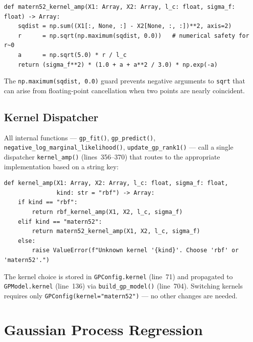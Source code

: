 \documentclass[11pt,a4paper]{article}
\theoremstyle{remark}
\newcommand{\codefile}[1]{\texttt{#1}}
\newcommand{\codeline}[1]{line~#1}
\newcommand{\coderange}[2]{lines~#1--#2}
\newcommand{\codefn}[1]{\texttt{#1()}}
\begin{document}
\begin{lstlisting}[firstnumber=343, caption=\codefn{matern52\_kernel\_amp} in \codefile{BO\_ML4F.py}]
def matern52_kernel_amp(X1: Array, X2: Array, l_c: float, sigma_f: float) -> Array:
    sqdist = np.sum((X1[:, None, :] - X2[None, :, :])**2, axis=2)
    r      = np.sqrt(np.maximum(sqdist, 0.0))   # numerical safety for r~0
    a      = np.sqrt(5.0) * r / l_c
    return (sigma_f**2) * (1.0 + a + a**2 / 3.0) * np.exp(-a)
\end{lstlisting}

The \texttt{np.maximum(sqdist, 0.0)} guard prevents negative arguments to
\texttt{sqrt} that can arise from floating-point cancellation when two points
are nearly coincident.

\subsection{Kernel Dispatcher}
\label{sec:dispatcher}

All internal functions --- \codefn{gp\_fit}, \codefn{gp\_predict},
\codefn{negative\_log\_marginal\_likelihood}, \codefn{update\_gp\_rank1}
--- call a single dispatcher \codefn{kernel\_amp} (\coderange{356}{370})
that routes to the appropriate implementation based on a string key:

\begin{lstlisting}[firstnumber=356, caption=\codefn{kernel\_amp} dispatcher in \codefile{BO\_ML4F.py}]
def kernel_amp(X1: Array, X2: Array, l_c: float, sigma_f: float,
               kind: str = "rbf") -> Array:
    if kind == "rbf":
        return rbf_kernel_amp(X1, X2, l_c, sigma_f)
    elif kind == "matern52":
        return matern52_kernel_amp(X1, X2, l_c, sigma_f)
    else:
        raise ValueError(f"Unknown kernel '{kind}'. Choose 'rbf' or 'matern52'.")
\end{lstlisting}

The kernel choice is stored in \texttt{GPConfig.kernel} (\codeline{71}) and
propagated to \texttt{GPModel.kernel} (\codeline{136}) via
\codefn{build\_gp\_model} (\codeline{704}).  Switching kernels requires only
\texttt{GPConfig(kernel="matern52")} --- no other changes are needed.

\section{Gaussian Process Regression}
\label{sec:gp}
\end{document}
